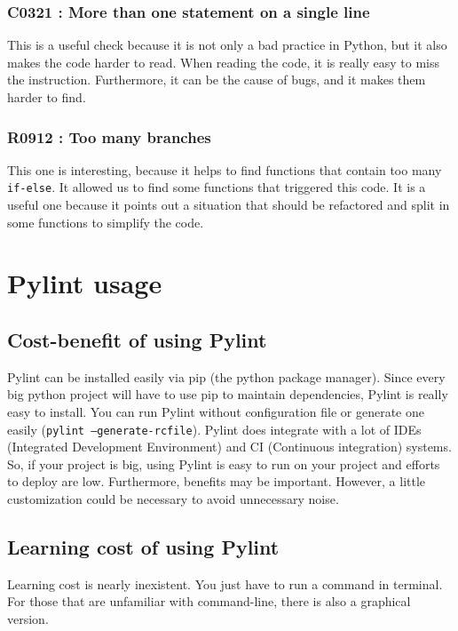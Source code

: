 \documentclass[12pt, a4paper]{article}
\newcommand{\pyl}{\textsf{Pylint}}
\begin{document}
\medskip
\subsubsection*{C0321 : More than one statement on a single line}
This is a useful check because it is not only a bad practice in Python, but it also makes the code harder to read.
When reading the code, it is really easy to miss the instruction.
Furthermore, it can be the cause of bugs, and it makes them harder to find.


\medskip
\subsubsection*{R0912 : Too many branches}
This one is interesting, because it helps to find functions that contain too many \lstinline|if-else|.
It allowed us to find some functions that triggered this code.
It is a useful one because it points out a situation that should be refactored and split in some functions to simplify the code.


\newpage
\section*{\pyl{} usage}
\subsection*{Cost-benefit of using \pyl{}}

\pyl{} can be installed easily via pip (the python package manager).
Since every big python project will have to use pip to maintain dependencies, \pyl{} is really easy to install.
You can run \pyl{} without configuration file or generate one easily (\texttt{pylint --generate-rcfile}).
\pyl{} does integrate with a lot of IDEs (Integrated Development Environment) and CI (Continuous integration) systems.
So, if your project is big, using \pyl{} is easy to run on your project and efforts to deploy are low.
Furthermore, benefits may be important.
However, a little customization could be necessary to avoid unnecessary noise.


\subsection*{Learning cost of using \pyl{}}

Learning cost is nearly inexistent.
You just have to run a command in terminal.
For those that are unfamiliar with command-line, there is also a graphical version.
\end{document}

